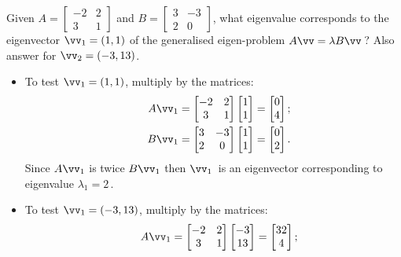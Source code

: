 \begin{example} \label{eg:}
Given \(A=\begin{bmatrix} -2&2\\3&1 \end{bmatrix}\) and \(B=\begin{bmatrix} 3&-3\\2&0 \end{bmatrix}\), what eigenvalue corresponds to the eigenvector \(\vv_1=(1,1)\) of the generalised eigen-problem \(A\vv=\lambda B\vv\)\,?  
Also answer for \(\vv_2=(-3,13)\).
\begin{solution} 
\begin{itemize}
\item To test \(\vv_1=(1,1)\), multiply by the matrices:
\begin{eqnarray*}
&&A\vv_1=\begin{bmatrix} -2&2\\3&1 \end{bmatrix}\begin{bmatrix} 1\\1 \end{bmatrix}
=\begin{bmatrix} 0\\4 \end{bmatrix};
\\&&B\vv_1=\begin{bmatrix} 3&-3\\2&0 \end{bmatrix}\begin{bmatrix} 1\\1 \end{bmatrix}
=\begin{bmatrix} 0\\2 \end{bmatrix}.
\end{eqnarray*}
Since \(A\vv_1\) is twice \(B\vv_1\) then \(\vv_1\)~is an eigenvector corresponding to eigenvalue \(\lambda_1=2\)\,.
\item To test \(\vv_1=(-3,13)\), multiply by the matrices:
\begin{eqnarray*}
&&A\vv_1=\begin{bmatrix} -2&2\\3&1 \end{bmatrix}\begin{bmatrix} -3\\13 \end{bmatrix}
=\begin{bmatrix} 32\\4 \end{bmatrix};

\end{eqnarray*}
\end{itemize}
\end{solution}
\end{example}
